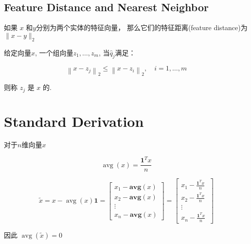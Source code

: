 \subsection{Feature Distance and Nearest Neighbor}

\begin{definition}
    如果 $ x $ 和$y$分别为两个实体的特征向量， 那么它们的特征距离(feature distance)为 $ \|x-y\|_{2} $
\end{definition}



\begin{definition}
    给定向量$x$, 一个组向量$ z_{1}, \ldots, z_{m} $, 当$ \hat{q}_{j} $满足：

    \begin{equation} \left\|x-z_{j}\right\|_{2} \leq\left\|x-z_{i}\right\|_{2}, \quad i=1, \ldots, m \end{equation}

    则称 $ z_{j} $ 是 $ x $ 的.
\end{definition}

\section{Standard Derivation}

\begin{definition}[算术平均值]
    对于$n$维向量$x$

    \begin{equation} \operatorname{avg}(x)=\frac{\mathbf{1}^{T} x}{n} \end{equation}
\end{definition}

\begin{definition}
    \begin{equation} \tilde{x}=x-\operatorname{avg}(x) \mathbf{1}\displaystyle =\left[\begin{array}{ c }
        x_{1} -\mathbf{avg} (x)\\
        x_{2} -\mathbf{avg} (x)\\
        \vdots \\
        x_{n} -\mathbf{avg} (x)
        \end{array}\right] =\left[\begin{array}{ c }
        x_{1} -\frac{\mathbf{1}^{T} x}{n} \ \\
        x_{2} -\frac{\mathbf{1}^{T} x}{n} \ \\
        \vdots \\
        x_{n} -\frac{\mathbf{1}^{T} x}{n} \ 
        \end{array}\right]\end{equation}

    因此 $ \operatorname{avg} (\tilde{x})=0 $
\end{definition}

